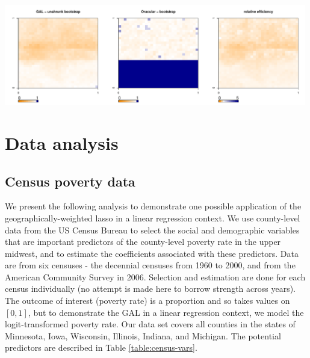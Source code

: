 	\begin{center}
		\includegraphics[width=0.99\textwidth]{../../figures/X1-28-18.pdf}
		\label{fig:coveragemap18}
	\end{center}
	

			
\section{Data analysis}
	\subsection{Census poverty data}
	We present the following analysis to demonstrate one possible application of the geographically-weighted lasso in a linear regression context. We use county-level data from the US Census Bureau to select the social and demographic variables that are important predictors of the county-level poverty rate in the upper midwest, and to estimate the coefficients associated with these predictors. Data are from six censuses - the decennial censuses from 1960 to 2000, and from the American Community Survey in 2006. Selection and estimation are done for each census individually (no attempt is made here to borrow strength across years). The outcome of interest (poverty rate) is a proportion and so takes values on $[0,1]$, but to demonstrate the GAL in a linear regression context, we model the logit-transformed poverty rate. Our data set covers all counties in the states of Minnesota, Iowa, Wisconsin, Illinois, Indiana, and Michigan. The potential predictors are described in Table \ref{table:census-vars}.\\
	
